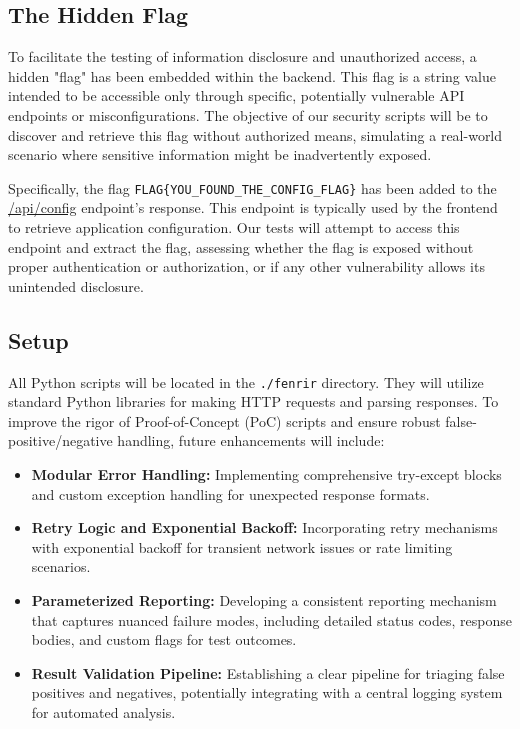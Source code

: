 \documentclass{article}
\begin{document}
\subsection{The Hidden Flag}
To facilitate the testing of information disclosure and unauthorized access, a hidden "flag" has been embedded within the backend. This flag is a string value intended to be accessible only through specific, potentially vulnerable API endpoints or misconfigurations. The objective of our security scripts will be to discover and retrieve this flag without authorized means, simulating a real-world scenario where sensitive information might be inadvertently exposed.

Specifically, the flag \texttt{FLAG\{YOU\_FOUND\_THE\_CONFIG\_FLAG\}} has been added to the \url{/api/config} endpoint's response. This endpoint is typically used by the frontend to retrieve application configuration. Our tests will attempt to access this endpoint and extract the flag, assessing whether the flag is exposed without proper authentication or authorization, or if any other vulnerability allows its unintended disclosure.

\subsection{Setup}
All Python scripts will be located in the \texttt{./fenrir} directory. They will utilize standard Python libraries for making HTTP requests and parsing responses. To improve the rigor of Proof-of-Concept (PoC) scripts and ensure robust false-positive/negative handling, future enhancements will include:
\begin{itemize}
    \item \textbf{Modular Error Handling:} Implementing comprehensive try-except blocks and custom exception handling for unexpected response formats.
    \item \textbf{Retry Logic and Exponential Backoff:} Incorporating retry mechanisms with exponential backoff for transient network issues or rate limiting scenarios.
    \item \textbf{Parameterized Reporting:} Developing a consistent reporting mechanism that captures nuanced failure modes, including detailed status codes, response bodies, and custom flags for test outcomes.
    \item \textbf{Result Validation Pipeline:} Establishing a clear pipeline for triaging false positives and negatives, potentially integrating with a central logging system for automated analysis.
\end{itemize}
\end{document}
